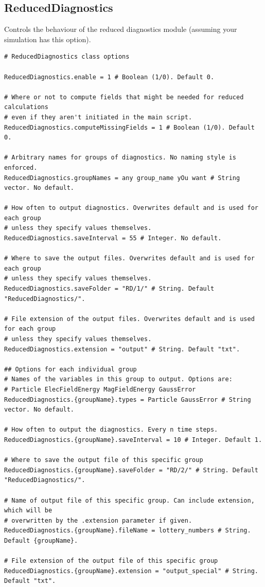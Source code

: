 \documentclass[11pt]{article}
\begin{document}
\subsection{ReducedDiagnostics}
Controls the behaviour of the reduced diagnostics module (assuming your simulation has this option).
\begin{lstlisting}[language=pkgconfig]
# ReducedDiagnostics class options

ReducedDiagnostics.enable = 1 # Boolean (1/0). Default 0.

# Where or not to compute fields that might be needed for reduced calculations
# even if they aren't initiated in the main script.
ReducedDiagnostics.computeMissingFields = 1 # Boolean (1/0). Default 0.

# Arbitrary names for groups of diagnostics. No naming style is enforced.
ReducedDiagnostics.groupNames = any group_name yOu want # String vector. No default.

# How often to output diagnostics. Overwrites default and is used for each group 
# unless they specify values themselves.
ReducedDiagnostics.saveInterval = 55 # Integer. No default.

# Where to save the output files. Overwrites default and is used for each group
# unless they specify values themselves.
ReducedDiagnostics.saveFolder = "RD/1/" # String. Default "ReducedDiagnostics/".

# File extension of the output files. Overwrites default and is used for each group
# unless they specify values themselves.
ReducedDiagnostics.extension = "output" # String. Default "txt".

## Options for each individual group
# Names of the variables in this group to output. Options are:
# Particle ElecFieldEnergy MagFieldEnergy GaussError
ReducedDiagnostics.{groupName}.types = Particle GaussError # String vector. No default.

# How often to output the diagnostics. Every n time steps.
ReducedDiagnostics.{groupName}.saveInterval = 10 # Integer. Default 1.

# Where to save the output file of this specific group
ReducedDiagnostics.{groupName}.saveFolder = "RD/2/" # String. Default "ReducedDiagnostics/".

# Name of output file of this specific group. Can include extension, which will be
# overwritten by the .extension parameter if given.
ReducedDiagnostics.{groupName}.fileName = lottery_numbers # String. Default {groupName}.

# File extension of the output file of this specific group
ReducedDiagnostics.{groupName}.extension = "output_special" # String. Default "txt".

\end{lstlisting}
\end{document}
